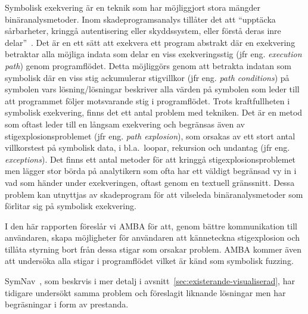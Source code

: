 Symbolisk exekvering är en teknik som har möjliggjort stora mängder binäranalysmetoder\cite{survey_symb_exc, symnav}.
Inom skadeprogramsanalys tillåter det att ``upptäcka sårbarheter, kringgå autentisering eller skyddssystem, eller förstå deras inre delar''~\cite{symnav}.
Det är en ett sätt att exekvera ett program abstrakt där en exekvering betraktar alla möjliga indata som delar en viss exekveringsstig (jfr eng. \emph{execution path}) genom programflödet.
Detta möjliggörs genom att betrakta indatan som symbolisk där en viss stig ackumulerar stigvillkor (jfr eng. \emph{path conditions}) på symbolen vars lösning/lösningar beskriver alla värden på symbolen som leder till att programmet följer motsvarande stig i programflödet.
Trots kraftfullheten i symbolisk exekvering, finns det ett antal problem med tekniken.
Det är en metod som oftast leder till en långsam exekvering och begränsas även av stigexplosionsproblemet (jfr eng. \emph{path explosion}), som orsakas av ett stort antal villkorstest på symbolisk data, i bl.a.\ loopar, rekursion och undantag (jfr eng. \emph{exceptions}).
Det finns ett antal metoder för att kringgå stigexplosionsproblemet men lägger stor börda på analytikern som ofta har ett väldigt begränsad vy in i vad som händer under exekveringen, oftast genom en textuell gränssnitt.
Dessa problem kan utnyttjas av skadeprogram för att vilseleda binäranalysmetoder som förlitar sig på symbolisk exekvering.

I den här rapporten föreslår vi AMBA för att, genom bättre kommunikation till användaren, skapa möjligheter för användaren att känneteckna stigexplosion och tillåta styrning bort från dessa stigar som orsakar problem. AMBA kommer även att undersöka alla stigar i programflödet vilket är känd som symbolisk fuzzing.

SymNav~\cite{symnav}, som beskrvis i mer detalj i avsnitt~\ref{sec:existerande-visualiserad}, har tidigare undersökt samma problem och föreslagit liknande lösningar men har begräsningar i form av prestanda.